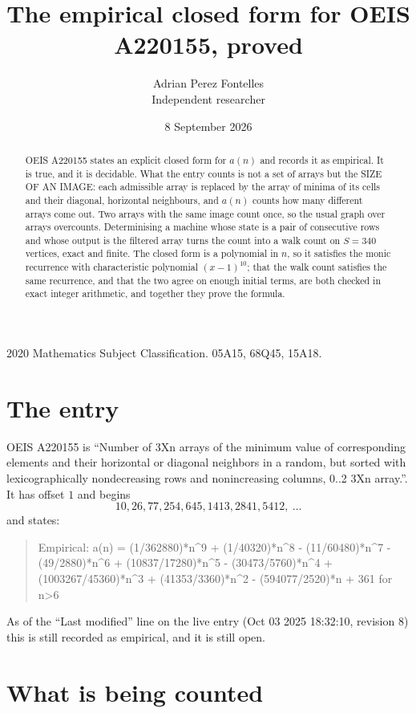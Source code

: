 \documentclass[11pt,a4paper]{article}
\title{The empirical closed form for OEIS A220155, proved}
\author{Adrian Perez Fontelles\\ \small Independent researcher}
\date{8 September 2026}
\theoremstyle{plain}
\theoremstyle{definition}
\begin{document}
\maketitle

\begin{abstract}
OEIS A220155 states an explicit closed form for $a(n)$ and records it as empirical. It is true, and
it is decidable. What the entry counts is not a set of arrays but the SIZE OF AN IMAGE: each
admissible array is replaced by the array of minima of its cells and their diagonal, horizontal neighbours,
and $a(n)$ counts how many different arrays come out. Two arrays with the same image count
once, so the usual graph over arrays overcounts. Determinising a machine whose state is a pair
of consecutive rows and whose output is the filtered array turns the count into a walk count on
$S=340$ vertices, exact and finite. The closed form is a polynomial in $n$, so it satisfies the
monic recurrence with characteristic polynomial $(x-1)^{10}$; that the walk count
satisfies the same recurrence, and that the two agree on enough initial terms, are both checked
in exact integer arithmetic, and together they prove the formula.
\end{abstract}

\noindent\small 2020 Mathematics Subject Classification. 05A15, 68Q45, 15A18.\normalsize

\section{The entry}

OEIS A220155 is ``Number of 3Xn arrays of the minimum value of corresponding elements and their horizontal or diagonal neighbors in a random, but sorted with lexicographically nondecreasing rows and nonincreasing columns, 0..2 3Xn array.''. It has offset $1$ and begins
\[
10, 26, 77, 254, 645, 1413, 2841, 5412,\ \dots
\]
and states:
\begin{quote}
Empirical: a(n) = (1/362880)*n\^{}9 + (1/40320)*n\^{}8 - (11/60480)*n\^{}7 - (49/2880)*n\^{}6 + (10837/17280)*n\^{}5 - (30473/5760)*n\^{}4 + (1003267/45360)*n\^{}3 + (41353/3360)*n\^{}2 - (594077/2520)*n + 361 for n>6
\end{quote}
As of the ``Last modified'' line on the live entry (Oct 03 2025 18:32:10, revision 8)
this is still recorded as empirical, and it is still open.

\section{What is being counted}
\end{document}
